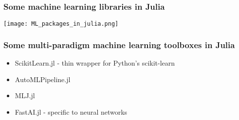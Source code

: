 \documentclass[t]{beamer}
\begin{document}






\begin{frame}
  \frametitle{Some machine learning libraries in Julia}
   \begin{center}
    \texttt{[image: ML\_packages\_in\_julia.png]}
   \end{center}
\end{frame}

\begin{frame}
  \frametitle{Some multi-paradigm machine learning toolboxes in Julia}
  \begin{itemize}
  \item ScikitLearn.jl - thin wrapper for Python's scikit-learn
  \item AutoMLPipeline.jl
  \item MLJ.jl
  \item FastAI.jl - specific to neural networks
  \end{itemize}
\end{frame}
\end{document}
